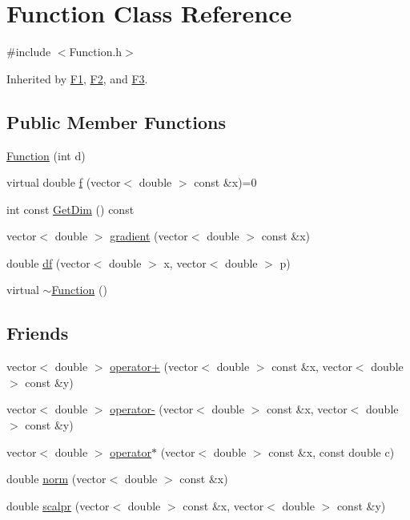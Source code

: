 \hypertarget{class_function}{}\section{Function Class Reference}
\label{class_function}


{\ttfamily \#include $<$Function.\+h$>$}



Inherited by \hyperlink{class_f1}{F1}, \hyperlink{class_f2}{F2}, and \hyperlink{class_f3}{F3}.

\subsection*{Public Member Functions}
\begin{DoxyCompactItemize}
\item 
\hyperlink{class_function_ac4ef8a9550f628915abdede307d652c0}{Function} (int d)
\item 
virtual double \hyperlink{class_function_ae9243748f484eb1135e55120fb0ccdea}{f} (vector$<$ double $>$ const \&x)=0
\item 
int const \hyperlink{class_function_a17f5d0b86f87e21a34b4379eab93ee39}{Get\+Dim} () const
\item 
vector$<$ double $>$ \hyperlink{class_function_a2ab0491b6a1e9c572b9522b08b1f4d33}{gradient} (vector$<$ double $>$ const \&x)
\item 
double \hyperlink{class_function_a79b1acaf1d2734de05bf19cd4f702ea5}{df} (vector$<$ double $>$ x, vector$<$ double $>$ p)
\item 
virtual \hyperlink{class_function_a3b03f7cf0b75d16edebdda1dee1db6fd}{$\sim$\+Function} ()
\end{DoxyCompactItemize}
\subsection*{Friends}
\begin{DoxyCompactItemize}
\item 
vector$<$ double $>$ \hyperlink{class_function_a05ab8c17d07aef0b5c10550a028b563f}{operator+} (vector$<$ double $>$ const \&x, vector$<$ double $>$ const \&y)
\item 
vector$<$ double $>$ \hyperlink{class_function_a22b6097cd533334d1f39264479bd5447}{operator-\/} (vector$<$ double $>$ const \&x, vector$<$ double $>$ const \&y)
\item 
vector$<$ double $>$ \hyperlink{class_function_ab1a2eaacfb92894b757013ff0c5a339b}{operator$\ast$} (vector$<$ double $>$ const \&x, const double c)
\item 
double \hyperlink{class_function_a735efccbb7bd970b9374f4b8ccd1f5ca}{norm} (vector$<$ double $>$ const \&x)
\item 
double \hyperlink{class_function_a51d95877d503ae53e2a0c2d4bf4da926}{scalpr} (vector$<$ double $>$ const \&x, vector$<$ double $>$ const \&y)
\end{DoxyCompactItemize}


